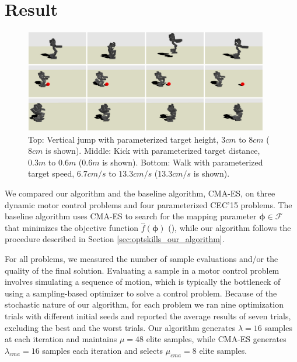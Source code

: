 \section{Result}
\begin{figure}[ht]
\center
  \includegraphics[width=0.95\textwidth]{images/motions}
  \caption{
Top: Vertical jump with parameterized target height, $3cm$ to
      $8cm$ ($8cm$ is shown).
      Middle: Kick with parameterized target distance, $0.3m$ to $0.6m$
      ($0.6m$ is shown).
      Bottom: Walk with parameterized target speed, $6.7cm/s$ to $13.3cm/s$
      ($13.3cm/s$ is shown).
  }
  \label{fig:optskills_motions}
\end{figure}

We compared our algorithm and the baseline
algorithm, CMA-ES, on three dynamic motor control problems and four
parameterized CEC'15 problems. The baseline algorithm uses CMA-ES to
search for the mapping parameter $\boldsymbol{\phi}\in\mathcal{F}$ that minimizes the
objective function $\hat{f}(\boldsymbol{\phi})$ (),
while our algorithm follows the procedure described in Section
\ref{sec:optskills_our_algorithm}.

For all problems, we measured the
number of sample evaluations and/or the quality of the final
solution. Evaluating a sample in a motor control problem involves
simulating a sequence of motion, which is typically the bottleneck of
using a sampling-based optimizer to solve a control problem. 
Because of the stochastic nature of our algorithm, for each problem we ran
nine optimization trials with different initial seeds and reported the
average results of seven trials, excluding the best and the worst
trials. Our algorithm generates $\lambda=16$ samples at each
iteration and maintains $\mu=48$ elite samples, while CMA-ES
generates $\lambda_{cma}=16$ samples each iteration and selects
$\mu_{cma}=8$ elite samples.

